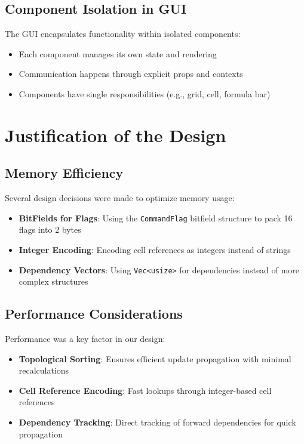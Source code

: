 \documentclass[12pt]{article}
\begin{document}
\subsection{Component Isolation in GUI}
The GUI encapsulates functionality within isolated components:
\begin{itemize}
    \item Each component manages its own state and rendering
    \item Communication happens through explicit props and contexts
    \item Components have single responsibilities (e.g., grid, cell, formula bar)
\end{itemize}

\section{Justification of the Design}

\subsection{Memory Efficiency}
Several design decisions were made to optimize memory usage:
\begin{itemize}
    \item \textbf{BitFields for Flags}: Using the \texttt{CommandFlag} bitfield structure to pack 16 flags into 2 bytes
    \item \textbf{Integer Encoding}: Encoding cell references as integers instead of strings
    \item \textbf{Dependency Vectors}: Using \texttt{Vec<usize>} for dependencies instead of more complex structures
\end{itemize}

\subsection{Performance Considerations}
Performance was a key factor in our design:
\begin{itemize}
    \item \textbf{Topological Sorting}: Ensures efficient update propagation with minimal recalculations
    \item \textbf{Cell Reference Encoding}: Fast lookups through integer-based cell references
    \item \textbf{Dependency Tracking}: Direct tracking of forward dependencies for quick propagation
\end{itemize}
\end{document}
